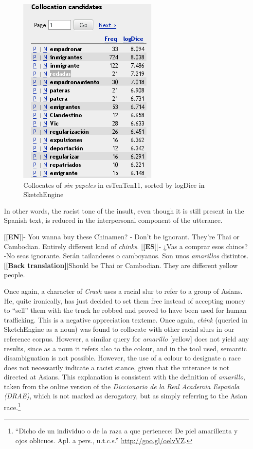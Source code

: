 \documentclass[output=paper]{LSP/langsci}
\begin{document}
\begin{figure}
\includegraphics[width=.4\textwidth]{./figures/4-6.png}
\caption{Collocates of \emph{sin papeles} in esTenTen11, sorted by logDice in SketchEngine} \label{fig:2:7}
\end{figure}

In other words, the racist tone of the insult, even though it is still present in the Spanish text, is reduced in the interpersonal component of the utterance.

\ea \label{ex:2:27}
\begin{xlist}
\exi{}[\textbf{[EN]}]{- You wanna buy these Chinamen? - Don't be ignorant. They're Thai or Cambodian. Entirely different kind of \emph{chinks}.}
\exi{}[\textbf{[ES]}]{- ¿Vas a comprar esos chinos? -No seas ignorante. Serán tailandeses o camboyanos. Son unos \emph{amarillos} distintos.}
\exi{}[\textbf{[Back translation]}]{Should be Thai or Cambodian. They are different yellow people.}
\end{xlist}
\z

Once again, a character of \textit{Crash} uses a racial slur to refer to a group of Asians. He, quite ironically, has just decided to set them free instead of accepting money to “sell” them with the truck he robbed and proved to have been used for human trafficking. This is a negative appreciation texteme. Once again, \textit{chink} (queried in SketchEngine as a noun) was found to collocate with other racial slurs in our reference corpus. However, a similar query for \textit{amarillo} [yellow] does not yield any results, since as a noun it refers also to the colour, and in the tool used, semantic disambiguation is not possible. However, the use of a colour to designate a race does not necessarily indicate a racist stance, given that the utterance is not directed at Asians. This explanation is consistent with the definition of \textit{amarillo}, taken from the online version of the \textit{Diccionario de la Real Academia Española} \textit{(DRAE)}, which is not marked as derogatory, but as simply referring to the Asian race.\footnote{“Dicho de un individuo o de la raza a que pertenece: De piel amarillenta y ojos oblicuos. Apl. a pers., u.t.c.s.” \url{http://goo.gl/oelvVZ}.}
\end{document}
